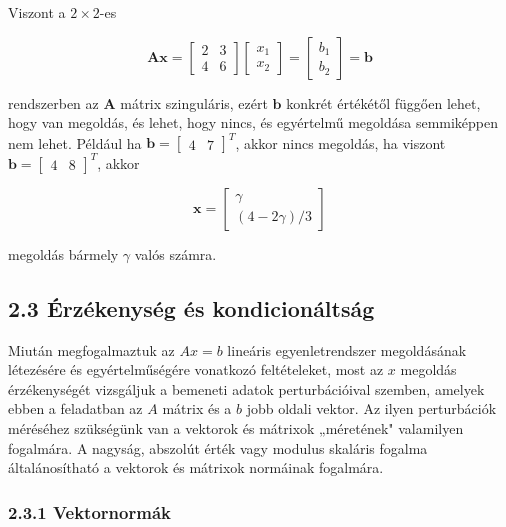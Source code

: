 \documentclass[
  magyar,
  11pt]{article}
\providecommand{\boldsymbol}[1]{\mathbf{#1}}
\begin{document}
Viszont a \(2 \times 2\)-es

\[\boldsymbol{A}\boldsymbol{x} = \begin{bmatrix} 2 & 3 \\ 4 & 6 \end{bmatrix} \begin{bmatrix} x_1 \\ x_2 \end{bmatrix} = \begin{bmatrix} b_1 \\ b_2 \end{bmatrix} = \boldsymbol{b}\]

rendszerben az \(\boldsymbol{A}\) mátrix szinguláris, ezért
\(\boldsymbol{b}\) konkrét értékétől függően lehet, hogy van megoldás,
és lehet, hogy nincs, és egyértelmű megoldása semmiképpen nem lehet.
Például ha \(\boldsymbol{b} = \begin{bmatrix} 4 & 7 \end{bmatrix}^T\),
akkor nincs megoldás, ha viszont
\(\boldsymbol{b} = \begin{bmatrix} 4 & 8 \end{bmatrix}^T\), akkor

\[\boldsymbol{x} = \begin{bmatrix} \gamma \\ (4 - 2\gamma)/3 \end{bmatrix}\]

megoldás bármely \(\gamma\) valós számra.

\subsection{2.3 Érzékenység és
kondicionáltság}\label{uxe9rzuxe9kenysuxe9g-uxe9s-kondicionuxe1ltsuxe1g-1}

Miután megfogalmaztuk az \(Ax = b\) lineáris egyenletrendszer
megoldásának létezésére és egyértelműségére vonatkozó feltételeket, most
az \(x\) megoldás érzékenységét vizsgáljuk a bemeneti adatok
perturbációival szemben, amelyek ebben a feladatban az \(A\) mátrix és a
\(b\) jobb oldali vektor. Az ilyen perturbációk méréséhez szükségünk van
a vektorok és mátrixok „méretének" valamilyen fogalmára. A nagyság,
abszolút érték vagy modulus skaláris fogalma általánosítható a vektorok
és mátrixok normáinak fogalmára.

\subsubsection{2.3.1 Vektornormák}\label{vektornormuxe1k}
\end{document}
